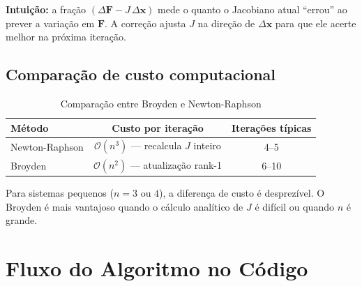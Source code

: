 \documentclass[
  12pt,
  a4paper,
  oneside,
  brazil
]{abntex2}
\begin{document}
\textbf{Intuição:} a fração $(\Delta\mathbf{F} - J\,\Delta\mathbf{x})$
mede o quanto o Jacobiano atual ``errou'' ao prever a variação em
$\mathbf{F}$. A correção ajusta $J$ na direção de $\Delta\mathbf{x}$
para que ele acerte melhor na próxima iteração.

\section{Comparação de custo computacional}

\begin{table}[h]
  \centering
  \caption{Comparação entre Broyden e Newton-Raphson}
  \begin{tabular}{lcc}
    \toprule
    \textbf{Método} & \textbf{Custo por iteração} & \textbf{Iterações típicas} \\
    \midrule
    Newton-Raphson & $\mathcal{O}(n^3)$ — recalcula $J$ inteiro & 4--5 \\
    Broyden        & $\mathcal{O}(n^2)$ — atualização rank-1    & 6--10 \\
    \bottomrule
  \end{tabular}
\end{table}

Para sistemas pequenos ($n = 3$ ou $4$), a diferença de custo é
desprezível. O Broyden é mais vantajoso quando o cálculo analítico de $J$
é difícil ou quando $n$ é grande.

\chapter{Fluxo do Algoritmo no Código}
\end{document}
